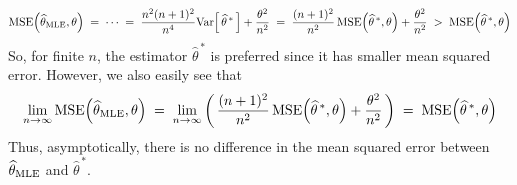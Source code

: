 \begin{equation*}
\textnormal{MSE}\!\left(\widehat{\theta}_{\textnormal{MLE}},\theta\right)
\;=\; \cdots \; = \; \dfrac{n^{2}(n+1)^{2}}{n^{4}}\textnormal{Var}\!\left[\,\widehat{\theta}^{\,*}\,\right] + \dfrac{\theta^{2}}{n^{2}}
\;=\; \dfrac{(n+1)^{2}}{n^{2}}\,\textnormal{MSE}\!\left(\widehat{\theta}^{\,*},\theta\right) + \dfrac{\theta^{2}}{n^{2}}
\;>\; \textnormal{MSE}\!\left(\widehat{\theta}^{\,*},\theta\right)
\end{equation*}
So, for finite $n$, the estimator $\widehat{\theta}^{\,*}$ is preferred since it has smaller mean squared error.
However, we also easily see that
\begin{equation*}
\lim_{n\rightarrow\infty}\textnormal{MSE}\!\left(\widehat{\theta}_{\textnormal{MLE}},\theta\right)
\;=\; \lim_{n\rightarrow\infty}\left(\,\dfrac{(n+1)^{2}}{n^{2}}\,\textnormal{MSE}\!\left(\widehat{\theta}^{\,*},\theta\right) + \dfrac{\theta^{2}}{n^{2}}\,\right)
\;=\; \textnormal{MSE}\!\left(\widehat{\theta}^{\,*},\theta\right)
\end{equation*}
Thus, asymptotically, there is no difference in the mean squared error
between $\widehat{\theta}_{\textnormal{MLE}}$ and $\widehat{\theta}^{\,*}$.




